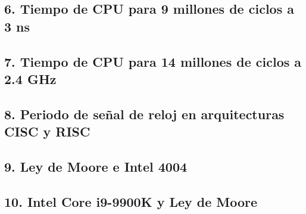 \documentclass[12pt]{article}
\begin{document}
\subsection*{6. Tiempo de CPU para 9 millones de ciclos a 3 ns}

\subsection*{7. Tiempo de CPU para 14 millones de ciclos a 2.4 GHz}

\subsection*{8. Periodo de señal de reloj en arquitecturas CISC y RISC}

\subsection*{9. Ley de Moore e Intel 4004}

\subsection*{10. Intel Core i9-9900K y Ley de Moore}



\end{document}
